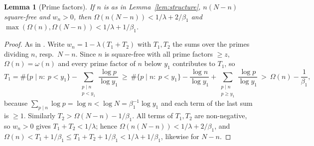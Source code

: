 \documentclass[11pt]{amsart}
\newtheorem{lemma}[theorem]{Lemma}
\theoremstyle{remark}
\begin{document}
\begin{lemma}[Prime factors]\label{lem:omega}
If $n$ is as in Lemma~\ref{lem:structure}, $n(N-n)$ square-free and $w_n>0$, then $\Omega(n(N-n))<1/\lambda+2/\beta_1$ and $\max(\Omega(n),\Omega(N-n))<1/\lambda+1/\beta_1$.
\end{lemma}
\begin{proof}
As in \cite[Lemma~3.2]{Chen2}. Write $w_n=1-\lambda(T_1+T_2)$ with $T_1,T_2$ the sums over the primes dividing $n$, resp.\ $N-n$. Since $n$ is square-free with all prime factors $\ge z$, $\Omega(n)=\omega(n)$ and every prime factor of $n$ below $y_1$ contributes to $T_1$, so
\[
T_1=\#\{p\mid n:\ p<y_1\}-\sum_{\substack{p\mid n\\ p<y_1}}\frac{\log p}{\log y_1}
\ \ge\ \#\{p\mid n:\ p<y_1\}-\frac{\log n}{\log y_1}+\sum_{\substack{p\mid n\\ p\ge y_1}}\frac{\log p}{\log y_1}
\ >\ \Omega(n)-\frac1{\beta_1},
\]
because $\sum_{p\mid n}\log p=\log n<\log N=\beta_1^{-1}\log y_1$ and each term of the last sum is $\ge1$. Similarly $T_2>\Omega(N-n)-1/\beta_1$. All terms of $T_1,T_2$ are non-negative, so $w_n>0$ gives $T_1+T_2<1/\lambda$; hence $\Omega(n(N-n))<1/\lambda+2/\beta_1$, and $\Omega(n)<T_1+1/\beta_1\le T_1+T_2+1/\beta_1<1/\lambda+1/\beta_1$, likewise for $N-n$.
\end{proof}
\end{document}
